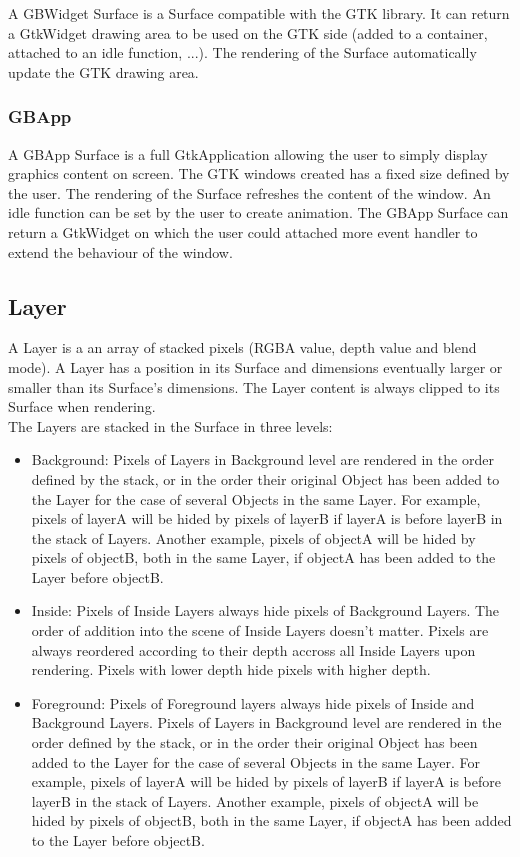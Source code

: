 A GBWidget Surface is a Surface compatible with the GTK library. It can return a GtkWidget drawing area to be used on the GTK side (added to a container, attached to an idle function, ...). The rendering of the Surface automatically update the GTK drawing area. 

\subsubsection{GBApp}

A GBApp Surface is a full GtkApplication allowing the user to simply display graphics content on screen. The GTK windows created has a fixed size defined by the user. The rendering of the Surface refreshes the content of the window. An idle function can be set by the user to create animation. The GBApp Surface can return a GtkWidget on which the user could attached more event handler to extend the behaviour of the window.\\ 

\subsection{Layer}

A Layer is a an array of stacked pixels (RGBA value, depth value and blend mode). A Layer has a position in its Surface and dimensions eventually larger or smaller than its Surface's dimensions. The Layer content is always clipped to its Surface when rendering.\\

The Layers are stacked in the Surface in three levels:\\
\begin{itemize}
\item Background: Pixels of Layers in Background level are rendered in the order defined by the stack, or in the order their original Object has been added to the Layer for the case of several Objects in the same Layer. For example, pixels of layerA will be hided by pixels of layerB if layerA is before layerB in the stack of Layers. Another example, pixels of objectA will be hided by pixels of objectB, both in the same Layer, if objectA has been added to the Layer before objectB.
\item Inside: Pixels of Inside Layers always hide pixels of Background Layers. The order of addition into the scene of Inside Layers doesn't matter. Pixels are always reordered according to their depth accross all Inside Layers upon rendering. Pixels with lower depth hide pixels with higher depth.
\item Foreground: Pixels of Foreground layers always hide pixels of Inside and Background Layers. Pixels of Layers in Background level are rendered in the order defined by the stack, or in the order their original Object has been added to the Layer for the case of several Objects in the same Layer. For example, pixels of layerA will be hided by pixels of layerB if layerA is before layerB in the stack of Layers. Another example, pixels of objectA will be hided by pixels of objectB, both in the same Layer, if objectA has been added to the Layer before objectB.
\end{itemize}

